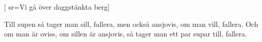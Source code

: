 [ 		
	sr={Vi gå över daggstänkta berg}]		
	
\beginverse*						
Till supen så tager man sill, fallera,
men också ansjovis, om man vill, fallera.
Och om man är oviss,
om sillen är ansjovis,
så tager man ett par supar till, fallera.
\endverse										
\endsong		
